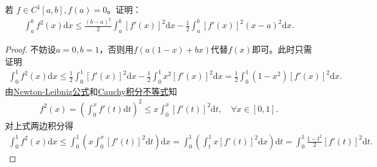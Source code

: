 \documentclass[../../main.tex]{subfiles}%
\begin{document}
\begin{example}
若 $f\in C^1[a,b],f(a)=0$。证明：
\begin{align*}
\int_{a}^{b} f^{2}(x)\mathrm{d}x \leqslant \frac{(b-a)^{2}}{2}\int_{a}^{b} [f'(x)]^{2}\mathrm{d}x - \frac{1}{2}\int_{a}^{b} [f'(x)]^{2}(x-a)^{2}\mathrm{d}x.
\end{align*}
\end{example}
\begin{proof}
不妨设$a=0,b=1$，否则用$f(a(1-x)+bx)$代替$f(x)$即可。此时只需证明
\begin{align*}
\int_{0}^{1} f^2(x)\mathrm{d}x \leqslant \frac{1}{2}\int_{0}^{1} \left[f'(x)\right]^2\mathrm{d}x - \frac{1}{2}\int_{0}^{1} x^2\left[f'(x)\right]^2\mathrm{d}x = \frac{1}{2}\int_{0}^{1} (1-x^2)\left[f'(x)\right]^2\mathrm{d}x.
\end{align*}
由\hyperref[theorem:Newton-Leibniz公式]{Newton-Leibniz公式}和\hyperref[theorem:Cauchy积分不等式]{Cauchy积分不等式}知
\begin{align*}
f^2(x) = \left( \int_{0}^{x} f'(t)\mathrm{d}t \right)^2 \leqslant x\int_{0}^{x} \left[f'(t)\right]^2\mathrm{d}t,\quad \forall x\in [0,1].
\end{align*}
对上式两边积分得
\begin{align*}
\int_{0}^{1} f^2(x)\mathrm{d}x \leqslant \int_{0}^{1} \left( x\int_{0}^{x} \left[f'(t)\right]^2\mathrm{d}t \right)\mathrm{d}x = \int_{0}^{1} \left( \int_{t}^{1} x\left[f'(t)\right]^2\mathrm{d}x \right)\mathrm{d}t = \int_{0}^{1} \frac{1-t^2}{2}\left[f'(t)\right]^2\mathrm{d}t.
\end{align*}
\end{proof}
\end{document}
